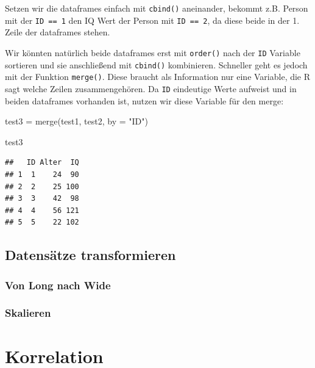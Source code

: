 \documentclass[
]{book}
\newenvironment{Shaded}{\begin{snugshade}}{\end{snugshade}}
\newcommand{\AttributeTok}[1]{\textcolor[rgb]{0.77,0.63,0.00}{#1}}
\newcommand{\FunctionTok}[1]{\textcolor[rgb]{0.00,0.00,0.00}{#1}}
\newcommand{\NormalTok}[1]{#1}
\newcommand{\OtherTok}[1]{\textcolor[rgb]{0.56,0.35,0.01}{#1}}
\newcommand{\StringTok}[1]{\textcolor[rgb]{0.31,0.60,0.02}{#1}}
\begin{document}
Setzen wir die dataframes einfach mit \texttt{cbind()} aneinander, bekommt z.B. Person mit der \texttt{ID\ ==\ 1} den IQ Wert der Person mit \texttt{ID\ ==\ 2}, da diese beide in der 1. Zeile der dataframes stehen.

Wir könnten natürlich beide dataframes erst mit \texttt{order()} nach der \texttt{ID} Variable sortieren und sie anschließend mit \texttt{cbind()} kombinieren. Schneller geht es jedoch mit der Funktion \texttt{merge()}. Diese braucht als Information nur eine Variable, die R sagt welche Zeilen zusammengehören. Da \texttt{ID} eindeutige Werte aufweist und in beiden dataframes vorhanden ist, nutzen wir diese Variable für den merge:

\begin{Shaded}
\begin{Highlighting}[]
\NormalTok{test3 }\OtherTok{=} \FunctionTok{merge}\NormalTok{(test1, test2, }\AttributeTok{by =} \StringTok{"ID"}\NormalTok{)}

\NormalTok{test3}
\end{Highlighting}
\end{Shaded}

\begin{verbatim}
##   ID Alter  IQ
## 1  1    24  90
## 2  2    25 100
## 3  3    42  98
## 4  4    56 121
## 5  5    22 102
\end{verbatim}

\hypertarget{datensuxe4tze-transformieren}{%
\section{Datensätze transformieren}\label{datensuxe4tze-transformieren}}

\hypertarget{von-long-nach-wide}{%
\subsection{Von Long nach Wide}\label{von-long-nach-wide}}

\hypertarget{skalieren}{%
\subsection{Skalieren}\label{skalieren}}

\hypertarget{korrelation}{%
\chapter{Korrelation}\label{korrelation}}
\end{document}
